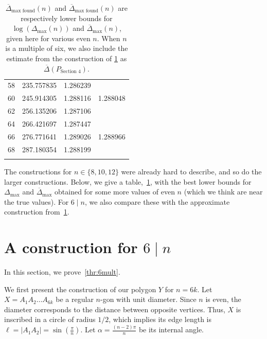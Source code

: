 \documentclass{article}
\theoremstyle{definition}
\newcommand*{\oD}{\overline \Delta}
\begin{document}
\begin{center}
\begin{longtable}{rrrr}
58 & 235.757835 & 1.286239 &  \\
60 & 245.914305 & 1.288116 & 1.288048 \\
62 & 256.135206 & 1.287106 &  \\
64 & 266.421697 & 1.287447 &  \\
66 & 276.771641 & 1.289026 & 1.288966 \\
68 & 287.180354 & 1.288199 &  \\
\bottomrule
\caption{$\overline{\Delta}_{\text{max found}}(n)$ and $\overline{\Delta}_{\text{max found}}(n)$ are respectively lower bounds for $\log(\Delta_{\mathrm{max}}(n))$ and $\overline{\Delta}_{\mathrm{max}}(n)$, given here for various even $n$. When \(n\) is a multiple of six, we also include the estimate from the construction of \cref{sec:diam_graph_6k} as $\overline{\Delta}(P_{\text{Section 4}})$.}\label{tab:lowerboundsDelta}
\end{longtable}
\end{center}


The constructions for $n \in \{8,10,12\}$ were already hard to describe, and so do the larger constructions. 
Below, we give a table,~\cref{tab:lowerboundsDelta}, with the best lower bounds for $\Delta_{\mathrm{max}}$ and $\oD_{\mathrm{max}}$ obtained for some more values of even $n$ (which we think are near the true values).
For $6 \mid n$, we also compare these with the approximate construction from~\cref{sec:diam_graph_6k}.




\section{A construction for $6 \mid n$}\label{sec:diam_graph_6k}

In this section, we prove~\cref{thr:6mult}.

We first present the construction of our polygon $Y$ for $n=6k$.
Let $X = A_1 A_2 \ldots A_{6k}$ be a regular $n$-gon with unit diameter. 
Since $n$ is even, the diameter corresponds to the distance between opposite vertices. Thus, $X$ is inscribed in a circle of radius $1/2$, which implies its edge length is $\ell = |A_1 A_2| = \sin(\frac{\pi}{n})$. Let $\alpha = \frac{(n-2)\pi}{n}$ be its internal angle. 
\end{document}
